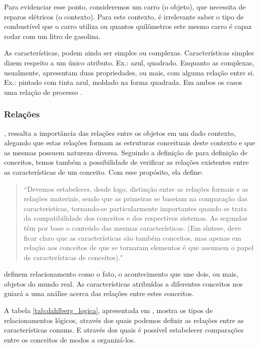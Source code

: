Para evidenciar esse ponto, consideremos um carro (o objeto), que necessita de reparos elétricos (o contexto). Para este contexto, é irrelevante saber o tipo de combustível que o carro utiliza ou quantos quilômetros este mesmo carro é capaz rodar com um litro de gasolina.

As características, podem ainda ser simples ou complexas. Características simples dizem respeito a um único atributo. Ex.: azul, quadrado. Enquanto as complexas, usualmente, apresentam duas propriedades, ou mais, com alguma relação entre si. Ex.: pintado com tinta azul, moldado na forma quadrada. Em ambos os casos uma relação de processo \citep{dahlberg:1978.teoria}.

\subsubsection{\hspace*{3pt} Relações}

\citet{campos:2004.modelizacao}, ressalta a importância das relações entre os objetos em um dado contexto, alegando que estas relações formam as estruturas conceituais deste contexto e que as mesmas possuem natureza diversa. Seguindo a definição de \citet{dahlberg:1978.fundamentos, dahlberg:1978.teoria} para definição de conceitos, temos também a possibilidade de verificar as relações existentes entre as características de um conceito. Com esse propósito, ela define:

\begin{quote}
``Devemos estabelecer, desde logo, distinção entre as relações formais e as relações materiais, sendo que as primeiras se baseiam na comparação das características, tornando-se particularmente importantes quando se trata da compatibilidade dos conceitos e dos respectivos sistemas. As segundas têm por base o conteúdo das mesmas características. (Em síntese, deve ficar claro que as características são também conceitos, mas apenas em relação aos conceitos de que se tornaram elementos é que assumem o papel de características de conceitos)." \citep[p.14]{dahlberg:1978.fundamentos}
\end{quote}
 
\citet{machado:2009.projeto} definem relacionamento como o fato, o acontecimento que une dois, ou mais, objetos do mundo real. As características atribuídas a diferentes conceitos nos guiará a uma análise acerca das relações entre estes conceitos.

A tabela \ref{tab:dahlberg_logica}, apresentada em \citet{dahlberg:1978.teoria}, mostra os tipos de relacionamentos lógicos, através dos quais podemos definir as relações entre as características comuns. E através dos quais é possível estabelecer comparações entre os conceitos de modos a organizá-los. 

